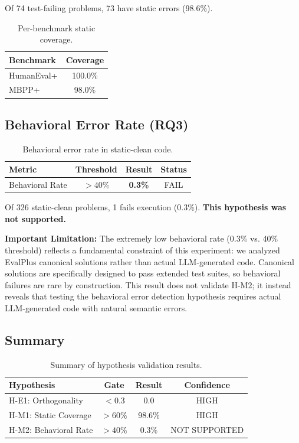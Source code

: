 Of 74 test-failing problems, 73 have static errors (98.6\%).

\begin{table}[h]
\centering
\begin{tabular}{lc}
\toprule
\textbf{Benchmark} & \textbf{Coverage} \\
\midrule
HumanEval+ & 100.0\% \\
MBPP+ & 98.0\% \\
\bottomrule
\end{tabular}
\caption{Per-benchmark static coverage.}
\label{tab:per_benchmark}
\end{table}

\subsection{Behavioral Error Rate (RQ3)}

\begin{table}[h]
\centering
\begin{tabular}{lccc}
\toprule
\textbf{Metric} & \textbf{Threshold} & \textbf{Result} & \textbf{Status} \\
\midrule
Behavioral Rate & $> 40\%$ & \textbf{0.3\%} & FAIL \\
\bottomrule
\end{tabular}
\caption{Behavioral error rate in static-clean code.}
\label{tab:behavioral}
\end{table}

Of 326 static-clean problems, 1 fails execution (0.3\%). \textbf{This hypothesis was not supported.}

\textbf{Important Limitation:} The extremely low behavioral rate (0.3\% vs. 40\% threshold) reflects a fundamental constraint of this experiment: we analyzed EvalPlus canonical solutions rather than actual LLM-generated code. Canonical solutions are specifically designed to pass extended test suites, so behavioral failures are rare by construction. This result does not validate H-M2; it instead reveals that testing the behavioral error detection hypothesis requires actual LLM-generated code with natural semantic errors.

\subsection{Summary}

\begin{table}[h]
\centering
\begin{tabular}{lccc}
\toprule
\textbf{Hypothesis} & \textbf{Gate} & \textbf{Result} & \textbf{Confidence} \\
\midrule
H-E1: Orthogonality & $< 0.3$ & 0.0 & HIGH \\
H-M1: Static Coverage & $> 60\%$ & 98.6\% & HIGH \\
H-M2: Behavioral Rate & $> 40\%$ & 0.3\% & NOT SUPPORTED \\
\bottomrule
\end{tabular}
\caption{Summary of hypothesis validation results.}
\label{tab:summary}
\end{table}
